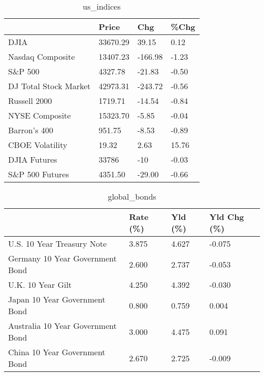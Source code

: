 \documentclass{article}%
\begin{document}
%


\begin{table}[htbp]%
\caption{us\_indices}%
\centering%
\begin{adjustbox}{width=1\textwidth}%
\begin{tabular}{llll}
\toprule
                      &    Price &     Chg &  \%Chg \\
\midrule
                 DJIA & 33670.29 &   39.15 &  0.12 \\
     Nasdaq Composite & 13407.23 & -166.98 & -1.23 \\
              S\&P 500 &  4327.78 &  -21.83 & -0.50 \\
DJ Total Stock Market & 42973.31 & -243.72 & -0.56 \\
         Russell 2000 &  1719.71 &  -14.54 & -0.84 \\
       NYSE Composite & 15323.70 &   -5.85 & -0.04 \\
         Barron's 400 &   951.75 &   -8.53 & -0.89 \\
      CBOE Volatility &    19.32 &    2.63 & 15.76 \\
         DJIA Futures &    33786 &     -10 & -0.03 \\
      S\&P 500 Futures &  4351.50 &  -29.00 & -0.66 \\
\bottomrule
\end{tabular}
%
\end{adjustbox}%
\end{table}

%


\begin{table}[htbp]%
\caption{global\_bonds}%
\centering%
\begin{adjustbox}{width=1\textwidth}%
\begin{tabular}{llll}
\toprule
                                  & Rate (\%) & Yld (\%) & Yld Chg (\%) \\
\midrule
       U.S. 10 Year Treasury Note &    3.875 &   4.627 &      -0.075 \\
  Germany 10 Year Government Bond &    2.600 &   2.737 &      -0.053 \\
                U.K. 10 Year Gilt &    4.250 &   4.392 &      -0.030 \\
    Japan 10 Year Government Bond &    0.800 &   0.759 &       0.004 \\
Australia 10 Year Government Bond &    3.000 &   4.475 &       0.091 \\
    China 10 Year Government Bond &    2.670 &   2.725 &      -0.009 \\
\bottomrule
\end{tabular}
%
\end{adjustbox}%
\end{table}
\end{document}
